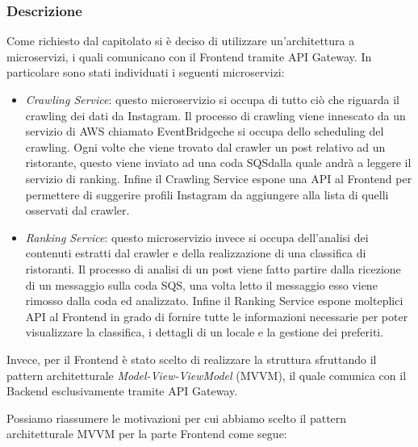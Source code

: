 \subsubsection{Descrizione}
Come richiesto dal capitolato si è deciso di utilizzare un'architettura a microservizi, i quali comunicano con il Frontend tramite API Gateway\glo.
In particolare sono stati individuati i seguenti microservizi:
\begin{itemize}
    \item \textit{Crawling Service}: questo microservizio si occupa di tutto ciò che riguarda il crawling dei dati da Instagram. Il processo di crawling viene innescato da un servizio di AWS chiamato EventBridge\glo che si occupa dello scheduling del crawling. Ogni volte che viene trovato dal crawler un post relativo ad un ristorante, questo viene inviato ad una coda SQS\glo dalla quale andrà a leggere il servizio di ranking. Infine il Crawling Service espone una API al Frontend per permettere di suggerire profili Instagram da aggiungere alla lista di quelli osservati dal crawler.
    \item \textit{Ranking Service}: questo microservizio invece si occupa dell'analisi dei contenuti estratti dal crawler e della realizzazione di una classifica di ristoranti. Il processo di analisi di un post viene fatto partire dalla ricezione di un messaggio sulla coda SQS, una volta letto il messaggio esso viene rimosso dalla coda ed analizzato. Infine il Ranking Service espone molteplici API al Frontend in grado di fornire tutte le informazioni necessarie per poter visualizzare la classifica, i dettagli di un locale e la gestione dei preferiti.
\end{itemize}

Invece, per il Frontend è stato scelto di realizzare la struttura sfruttando il pattern architetturale \textit{Model-View-ViewModel} (MVVM), il quale comunica con il Backend esclusivamente tramite API Gateway.

Possiamo riassumere le motivazioni per cui abbiamo scelto il pattern architetturale MVVM per la parte Frontend come segue:

